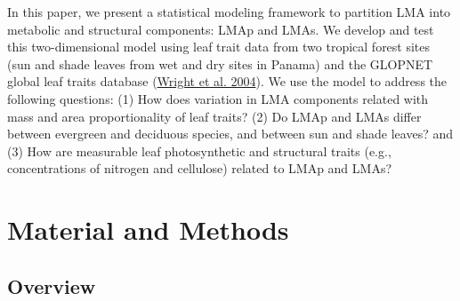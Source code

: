 \documentclass[
  12pt,
  a4paper,
,tablecaptionabove
]{scrartcl}
\begin{document}
In this paper, we present a statistical modeling framework to partition LMA into metabolic and structural components: LMAp and LMAs.
We develop and test this two-dimensional model using leaf trait data from two tropical forest sites (sun and shade leaves from wet and dry sites in Panama) and the GLOPNET global leaf traits database (\protect\hyperlink{ref-Wright2004a}{Wright et al. 2004}).
We use the model to address the following questions: (1) How does variation in LMA components related with mass and area proportionality of leaf traits? (2) Do LMAp and LMAs differ between evergreen and deciduous species, and between sun and shade leaves? and (3) How are measurable leaf photosynthetic and structural traits (e.g., concentrations of nitrogen and cellulose) related to LMAp and LMAs?

\hypertarget{material-and-methods}{%
\section{Material and Methods}\label{material-and-methods}}

\hypertarget{overview}{%
\subsection{Overview}\label{overview}}
\end{document}
